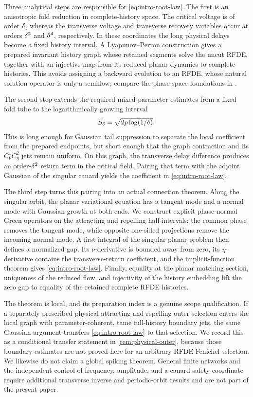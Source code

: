 Three analytical steps are responsible for \eqref{eq:intro-root-law}.  The
first is an anisotropic fold reduction in complete-history space.  The
critical voltage is of order \(\delta\), whereas the transverse voltage and
transverse recovery variables occur at orders \(\delta^2\) and \(\delta^4\),
respectively.  In these coordinates the long physical delays become a fixed
history interval.  A Lyapunov--Perron construction gives a prepared invariant
history graph whose retained segments solve the uncut RFDE, together with an injective map from
its reduced planar dynamics to complete histories.  This avoids assigning a
backward evolution to an RFDE, whose natural solution operator is only a
semiflow; compare the phase-space foundations in
\citet{hale1993introduction}.

The second step extends the required mixed parameter estimates from a fixed
fold tube to the logarithmically growing interval
\[
 S_\delta=\sqrt{2p\log(1/\delta)}.
\]
This is long enough for Gaussian tail suppression to separate the local
coefficient from the prepared endpoints, but short enough that the graph
contraction and its \(C_\nu^1C_\eta^2\) jets remain uniform.  On this graph,
the transverse delay difference produces an order-\(\delta^2\) return term in
the critical field.  Pairing that term with the adjoint Gaussian of the
singular canard yields the coefficient in \eqref{eq:intro-root-law}.

The third step turns this pairing into an actual connection theorem.  Along
the singular orbit, the planar variational equation has a tangent mode and a
normal mode with Gaussian growth at both ends.  We construct explicit
phase-normal Green operators on the attracting and repelling half-intervals:
the common phase removes the tangent mode, while opposite one-sided
projections remove the incoming normal mode.  A first integral of the
singular planar problem then defines a normalized gap.  Its
\(\nu\)-derivative is bounded away from zero, its \(\eta\)-derivative contains
the transverse-return coefficient, and the implicit-function theorem gives
\eqref{eq:intro-root-law}.  Finally, equality at the planar matching section,
uniqueness of the reduced flow, and injectivity of the history embedding
lift the zero gap to equality of the retained complete RFDE histories.

The theorem is local, and its preparation index is a genuine scope
qualification.  If a separately prescribed physical attracting and
repelling outer selection enters the local graph with parameter-coherent,
tame full-history boundary jets, the same Gaussian argument transfers
\eqref{eq:intro-root-law} to that selection.  We record this as a conditional
transfer statement in \cref{rem:physical-outer}, because those boundary estimates are not proved here for an
arbitrary RFDE Fenichel selection.  We likewise do not claim a global
spiking theorem.  General finite networks and the independent control of
frequency, amplitude, and a canard-safety coordinate require additional
transverse inverse and periodic-orbit results and are not part of the present
paper.

